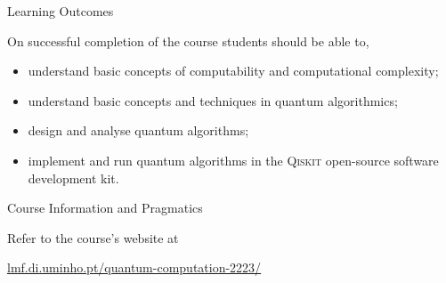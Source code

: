 \documentclass{beamer}
\begin{document}
\begin{frame}{Learning Outcomes}

On successful completion of the course students should be able to,

\begin{itemize}
\item understand basic concepts of computability and computational complexity;
\item understand basic concepts and techniques in quantum algorithmics;
\item design and analyse quantum algorithms;
\item implement and run quantum algorithms in the \alert{\textsc{Qiskit}} 
        open-source software development kit.
\end{itemize}

\end{frame}

\begin{frame}{Course Information and Pragmatics}

\begin{block}{Refer to the course's website at}
\begin{center}
        \url{lmf.di.uminho.pt/quantum-computation-2223/}
\end{center}
\end{block}

\end{frame}

\begin{frame}[plain]

\end{frame}
\end{document}
